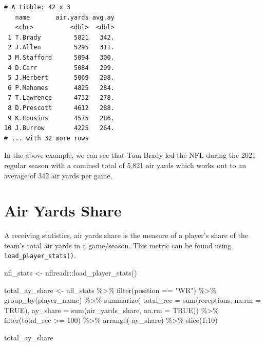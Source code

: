\documentclass[
  letterpaper,
]{krantz}
\newenvironment{Shaded}{\begin{snugshade}}{\end{snugshade}}
\newcommand{\AttributeTok}[1]{\textcolor[rgb]{0.40,0.45,0.13}{#1}}
\newcommand{\ConstantTok}[1]{\textcolor[rgb]{0.56,0.35,0.01}{#1}}
\newcommand{\DecValTok}[1]{\textcolor[rgb]{0.68,0.00,0.00}{#1}}
\newcommand{\FunctionTok}[1]{\textcolor[rgb]{0.28,0.35,0.67}{#1}}
\newcommand{\NormalTok}[1]{\textcolor[rgb]{0.00,0.23,0.31}{#1}}
\newcommand{\OtherTok}[1]{\textcolor[rgb]{0.00,0.23,0.31}{#1}}
\newcommand{\SpecialCharTok}[1]{\textcolor[rgb]{0.37,0.37,0.37}{#1}}
\newcommand{\StringTok}[1]{\textcolor[rgb]{0.13,0.47,0.30}{#1}}
\begin{document}
\begin{verbatim}
# A tibble: 42 x 3
   name       air.yards avg.ay
   <chr>          <dbl>  <dbl>
 1 T.Brady         5821   342.
 2 J.Allen         5295   311.
 3 M.Stafford      5094   300.
 4 D.Carr          5084   299.
 5 J.Herbert       5069   298.
 6 P.Mahomes       4825   284.
 7 T.Lawrence      4732   278.
 8 D.Prescott      4612   288.
 9 K.Cousins       4575   286.
10 J.Burrow        4225   264.
# ... with 32 more rows
\end{verbatim}

In the above example, we can see that Tom Brady led the NFL during the
2021 regular season with a comined total of 5,821 air yards which works
out to an average of 342 air yards per game.

\hypertarget{air-yards-share}{%
\section{Air Yards Share}\label{air-yards-share}}

A receiving statistics, air yards share is the measure of a player's
share of the team's total air yards in a game/season. This metric can be
found using \texttt{load\_player\_stats()}.

\begin{Shaded}
\begin{Highlighting}[]
\NormalTok{nfl\_stats }\OtherTok{\textless{}{-}}\NormalTok{ nflreadr}\SpecialCharTok{::}\FunctionTok{load\_player\_stats}\NormalTok{()}

\NormalTok{total\_ay\_share }\OtherTok{\textless{}{-}}\NormalTok{ nfl\_stats }\SpecialCharTok{\%\textgreater{}\%}
  \FunctionTok{filter}\NormalTok{(position }\SpecialCharTok{==} \StringTok{"WR"}\NormalTok{) }\SpecialCharTok{\%\textgreater{}\%}
  \FunctionTok{group\_by}\NormalTok{(player\_name) }\SpecialCharTok{\%\textgreater{}\%}
  \FunctionTok{summarize}\NormalTok{(}
    \AttributeTok{total\_rec =} \FunctionTok{sum}\NormalTok{(receptions, }\AttributeTok{na.rm =} \ConstantTok{TRUE}\NormalTok{),}
    \AttributeTok{ay\_share =} \FunctionTok{sum}\NormalTok{(air\_yards\_share, }\AttributeTok{na.rm =} \ConstantTok{TRUE}\NormalTok{)) }\SpecialCharTok{\%\textgreater{}\%}
  \FunctionTok{filter}\NormalTok{(total\_rec }\SpecialCharTok{\textgreater{}=} \DecValTok{100}\NormalTok{) }\SpecialCharTok{\%\textgreater{}\%}
  \FunctionTok{arrange}\NormalTok{(}\SpecialCharTok{{-}}\NormalTok{ay\_share) }\SpecialCharTok{\%\textgreater{}\%}
  \FunctionTok{slice}\NormalTok{(}\DecValTok{1}\SpecialCharTok{:}\DecValTok{10}\NormalTok{)}

\NormalTok{total\_ay\_share}
\end{Highlighting}
\end{Shaded}
\end{document}
